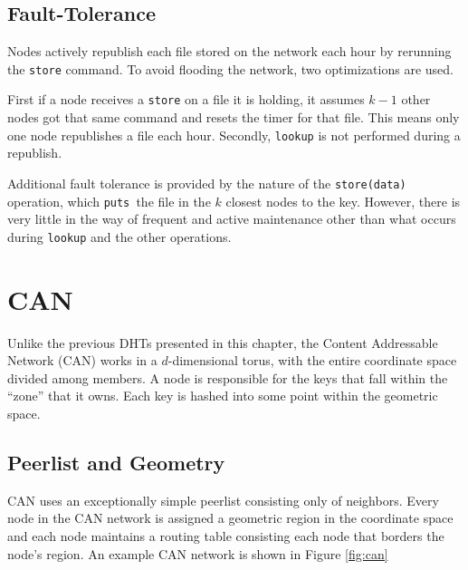 \subsection*{Fault-Tolerance}
Nodes actively republish each file stored on the network each hour by rerunning the \texttt{store} command.  
To avoid flooding the network, two optimizations are used.

First if a node receives a \texttt{store} on a file it is holding, it assumes $k-1$ other nodes got that same command and resets the timer for that file.
This means only one node republishes a file each hour.
Secondly, \texttt{lookup} is not performed during a republish.


Additional fault tolerance is provided by the nature of the \texttt{store(data)} operation, which \texttt{puts }the file in the $k$ closest nodes to the key.
However, there is very little in the way of frequent and active maintenance other than what occurs during \texttt{lookup} and the other operations.












\section{CAN}


Unlike the previous DHTs presented in this chapter, the Content Addressable Network (CAN) \cite{can} works in a $d$-dimensional torus, with the entire coordinate space divided among members.
A node is responsible for the keys  that fall within the ``zone'' that it owns.
Each key is hashed into some point within the geometric space.

\subsection*{Peerlist and Geometry}
CAN uses an exceptionally simple peerlist consisting only of neighbors.  
Every node in the CAN network is assigned a geometric region in the coordinate space and each node maintains a routing table consisting each node that borders the node's region.
An example CAN network is shown in Figure \ref{fig:can}


